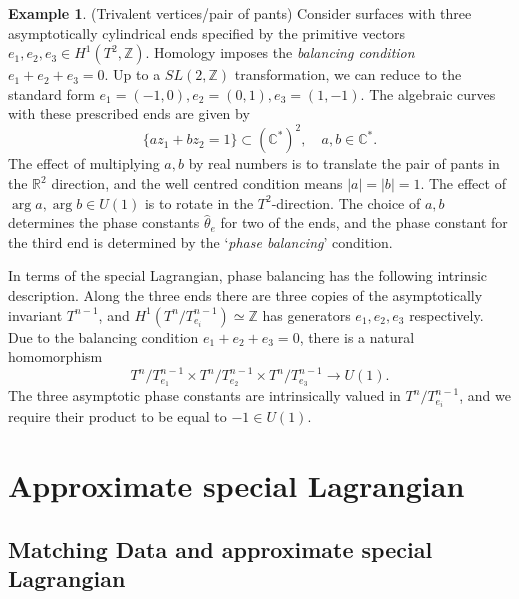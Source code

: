 \documentclass{article}
\theoremstyle{definition}
\newtheorem{eg}[thm]{Example}
\newcommand{\R}{\mathbb{R}}
\newcommand{\C}{\mathbb{C}}
\newcommand{\Z}{\mathbb{Z}}
\begin{document}
	
	
	\begin{eg}
		(Trivalent vertices/pair of pants)
		Consider surfaces with three asymptotically cylindrical ends specified by the primitive vectors $e_1, e_2, e_3\in H^1(T^2, \Z)$. Homology imposes the \emph{balancing condition} $e_1+e_2+e_3=0$. Up to a $SL(2,\Z)$ transformation, we can reduce to the standard form $e_1=(-1,0), e_2=(0,1), e_3=(1,-1)$. The algebraic curves with these prescribed ends are given by
		\[
		\{ a z_1+ b z_2=1 \}\subset (\C^*)^2, \quad a, b\in \C^*.
		\]
		The effect of multiplying $a, b$ by real numbers is to translate the pair of pants in the $\R^2$ direction, and the well centred condition means $|a|=|b|=1$. The effect of $\arg a, \arg b\in U(1)$ is to rotate in the $T^2$-direction. 
		The choice of $a, b$ determines the phase constants $\hat{\theta}_e$ for two of the ends, and the phase constant for the third end is determined by the `\emph{phase balancing}' condition.
		
		
		
		
		
		In terms of the special Lagrangian, phase balancing has the following intrinsic description. Along the three ends there are three copies of the asymptotically invariant $T^{n-1}$, and $H^1(T^n/T^{n-1}_{e_i})\simeq \Z$ has generators $e_1, e_2, e_3$ respectively. Due to the balancing condition $e_1+e_2+e_3=0$, there is a natural homomorphism
		\[
		T^n/T^{n-1}_{e_1}\times T^n/T^{n-1}_{e_2} \times T^n/T^{n-1}_{e_3}\to U(1).
		\]
		The three asymptotic phase constants are intrinsically valued in $T^n/T^{n-1}_{e_i}$, and we require their product to be equal to $-1\in U(1)$.
	\end{eg}
	
	
	
	
	\section{Approximate special Lagrangian}
	
	
	\subsection{Matching Data and approximate special Lagrangian}\label{sec: matching data}
	
\end{document}
